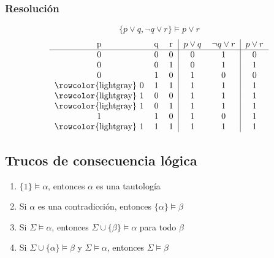 \documentclass{article}
\begin{document}
\subsubsection{Resolución}
$$\{ p \vee{} q, \neg{} q \vee{} r \} \models{} p \vee{} r$$
\[
    \begin{tabular}{ccc|cc|c}
        p & q & r & $p \vee{} q$ & $\neg{} q \vee{} r$ & $p \vee{} r$ \\ \hline
        0 & 0 & 0 & 0 & 1 & 0\\
        0 & 0 & 1 & 0 & 1 & 1\\
        0 & 1 & 0 & 1 & 0 & 0\\
        \rowcolor{lightgray} 0 & 1 & 1 & 1 & 1 & 1\\
        \rowcolor{lightgray} 1 & 0 & 0 & 1 & 1 & 1\\
        \rowcolor{lightgray} 1 & 0 & 1 & 1 & 1 & 1\\
        1 & 1 & 0 & 1 & 0 & 1\\
        \rowcolor{lightgray} 1 & 1 & 1 & 1 & 1 & 1\\
    \end{tabular}
\]

\subsection{Trucos de consecuencia lógica}
\begin{enumerate}
    \item $\{ 1 \} \models{} \alpha{}$, entonces $\alpha$ es una tautología
    \item Si $\alpha$ es una contradicción, entonces $\{ \alpha{} \} \models{} \beta{}$
    \item Si $\Sigma{} \models{} \alpha{}$, entonces $\Sigma{} \cup{} \{ \beta{} \} \models{} \alpha{}$ para todo $\beta$
    \item Si $\Sigma{} \cup{} \{ \alpha{} \} \models{} \beta{}$ y $\Sigma{} \models{} \alpha{}$, entonces $\Sigma{} \models{} \beta{}$
\end{enumerate}
\end{document}
